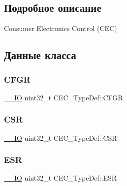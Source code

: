 \subsection{Подробное описание}
Consumer Electronics Control (C\+EC) 

\subsection{Данные класса}
\mbox{\label{struct_c_e_c___type_def_a91a55cd277c20e5c5ad228fd9013d014}} 
\subsubsection{\texorpdfstring{CFGR}{CFGR}}
{\footnotesize\ttfamily \mbox{\hyperlink{group___c_m_s_i_s___c_m3__core__definitions_gaec43007d9998a0a0e01faede4133d6be}{\+\_\+\+\_\+\+IO}} uint32\+\_\+t C\+E\+C\+\_\+\+Type\+Def\+::\+C\+F\+GR}

\mbox{\label{struct_c_e_c___type_def_ad9aa13645f701c5457fbf51a9ecf7aa4}} 
\subsubsection{\texorpdfstring{CSR}{CSR}}
{\footnotesize\ttfamily \mbox{\hyperlink{group___c_m_s_i_s___c_m3__core__definitions_gaec43007d9998a0a0e01faede4133d6be}{\+\_\+\+\_\+\+IO}} uint32\+\_\+t C\+E\+C\+\_\+\+Type\+Def\+::\+C\+SR}

\mbox{\label{struct_c_e_c___type_def_a90adcbf5ee626747170b2f208770628f}} 
\subsubsection{\texorpdfstring{ESR}{ESR}}
{\footnotesize\ttfamily \mbox{\hyperlink{group___c_m_s_i_s___c_m3__core__definitions_gaec43007d9998a0a0e01faede4133d6be}{\+\_\+\+\_\+\+IO}} uint32\+\_\+t C\+E\+C\+\_\+\+Type\+Def\+::\+E\+SR}

\mbox{\label{struct_c_e_c___type_def_aa578935e8a0795a0a7494f4d281bc43d}} 
